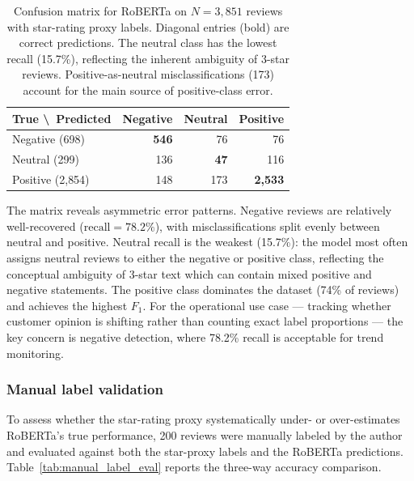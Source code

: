 \begin{table}[H]
  \centering
  \begin{tabular}{lrrr}
    \toprule
    \textbf{True \textbackslash\ Predicted} & \textbf{Negative} & \textbf{Neutral} & \textbf{Positive} \\
    \midrule
    Negative (698)   & \textbf{546} & 76  & 76 \\
    Neutral (299)    & 136          & \textbf{47} & 116 \\
    Positive (2{,}854) & 148        & 173 & \textbf{2{,}533} \\
    \bottomrule
  \end{tabular}
  \caption{Confusion matrix for RoBERTa on $N = 3{,}851$ reviews with star-rating proxy labels.
  Diagonal entries (bold) are correct predictions. The neutral class has the lowest recall (15.7\%),
  reflecting the inherent ambiguity of 3-star reviews. Positive-as-neutral misclassifications (173)
  account for the main source of positive-class error.}
  \label{tab:roberta_confusion}
\end{table}

The matrix reveals asymmetric error patterns. Negative reviews are relatively well-recovered
($\text{recall} = 78.2\%$), with misclassifications split evenly between neutral and positive.
Neutral recall is the weakest (15.7\%): the model most often assigns neutral reviews to either
the negative or positive class, reflecting the conceptual ambiguity of 3-star text which can
contain mixed positive and negative statements. The positive class dominates the dataset (74\% of
reviews) and achieves the highest $F_1$. For the operational use case --- tracking whether
customer opinion is shifting rather than counting exact label proportions --- the key concern is
negative detection, where 78.2\% recall is acceptable for trend monitoring.

\subsubsection*{Manual label validation}

To assess whether the star-rating proxy systematically under- or over-estimates
RoBERTa's true performance, 200 reviews were manually labeled by the author and
evaluated against both the star-proxy labels and the RoBERTa predictions.
Table~\ref{tab:manual_label_eval} reports the three-way accuracy comparison.

